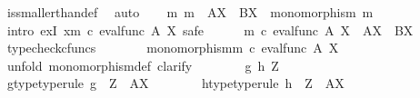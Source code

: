 \begin{isabellebody}
\ is{\isacharunderscore}{\kern0pt}smaller{\isacharunderscore}{\kern0pt}than{\isacharunderscore}{\kern0pt}def\ \isamarkupfalse%
\ auto\isanewline
\ \ \isamarkupfalse%
\ {\isachardoublequoteopen}{\isasymexists}m{\isachardot}{\kern0pt}\ m\ {\isacharcolon}{\kern0pt}\ A\isactrlbsup X\isactrlesup \ {\isasymrightarrow}\ B\isactrlbsup X\isactrlesup \ {\isasymand}\ monomorphism\ m{\isachardoublequoteclose}\isanewline
\ \ \isamarkupfalse%
\ {\isacharparenleft}{\kern0pt}intro\ exI{\isacharbrackleft}{\kern0pt}\ x{\isacharequal}{\kern0pt}{\isachardoublequoteopen}{\isacharparenleft}{\kern0pt}m\ {\isasymcirc}\isactrlsub c\ eval{\isacharunderscore}{\kern0pt}func\ A\ X{\isacharparenright}{\kern0pt}\isactrlsup {\isasymsharp}{\isachardoublequoteclose}{\isacharbrackright}{\kern0pt}{\isacharcomma}{\kern0pt}\ safe{\isacharparenright}{\kern0pt}\isanewline
\ \ \ \ \isamarkupfalse%
\ {\isachardoublequoteopen}{\isacharparenleft}{\kern0pt}m\ {\isasymcirc}\isactrlsub c\ eval{\isacharunderscore}{\kern0pt}func\ A\ X{\isacharparenright}{\kern0pt}\isactrlsup {\isasymsharp}\ {\isacharcolon}{\kern0pt}\ A\isactrlbsup X\isactrlesup \ {\isasymrightarrow}\ B\isactrlbsup X\isactrlesup {\isachardoublequoteclose}\isanewline
\ \ \ \ \ \ \isamarkupfalse%
\ typecheck{\isacharunderscore}{\kern0pt}cfuncs\isanewline
\ \ \ \ \isamarkupfalse%
\ \isamarkupfalse%
\ {\isachardoublequoteopen}monomorphism{\isacharparenleft}{\kern0pt}{\isacharparenleft}{\kern0pt}m\ {\isasymcirc}\isactrlsub c\ eval{\isacharunderscore}{\kern0pt}func\ A\ X{\isacharparenright}{\kern0pt}\isactrlsup {\isasymsharp}{\isacharparenright}{\kern0pt}{\isachardoublequoteclose}\isanewline
\ \ \ \ \isamarkupfalse%
\ {\isacharparenleft}{\kern0pt}unfold\ monomorphism{\isacharunderscore}{\kern0pt}def{}{\isacharcomma}{\kern0pt}\ clarify{\isacharparenright}{\kern0pt}\isanewline
\ \ \ \ \ \ \isamarkupfalse%
\ g\ h\ Z\isanewline
\ \ \ \ \ \ \isamarkupfalse%
\ g{\isacharunderscore}{\kern0pt}type{\isacharbrackleft}{\kern0pt}type{\isacharunderscore}{\kern0pt}rule{\isacharbrackright}{\kern0pt}{\isacharcolon}{\kern0pt}\ {\isachardoublequoteopen}g\ {\isacharcolon}{\kern0pt}\ Z\ {\isasymrightarrow}\ A\isactrlbsup X\isactrlesup {\isachardoublequoteclose}\isanewline
\ \ \ \ \ \ \isamarkupfalse%
\ h{\isacharunderscore}{\kern0pt}type{\isacharbrackleft}{\kern0pt}type{\isacharunderscore}{\kern0pt}rule{\isacharbrackright}{\kern0pt}{\isacharcolon}{\kern0pt}\ {\isachardoublequoteopen}h\ {\isacharcolon}{\kern0pt}\ Z\ {\isasymrightarrow}\ A\isactrlbsup X\isactrlesup {\isachardoublequoteclose}\isanewline

\end{isabellebody}
